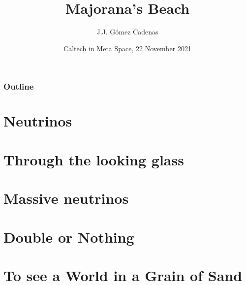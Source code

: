 \documentclass[9pt]{beamer}
\title{Majorana's Beach}
\author{J.J. G\'omez Cadenas}
\institute{Donostia International Physics Center (DIPC)} %
\date[November 22, 2021] %
{Caltech in Meta Space, 22 November 2021}
\begin{document}
\frame{\titlepage}


\begin{frame}
\frametitle{Outline}
\tableofcontents
\end{frame}

\section{Neutrinos}




\section{Through the looking glass}


\section{Massive neutrinos}


\section{Double or Nothing}


\section{To see a World in a Grain of Sand }





%
%
\end{document}
